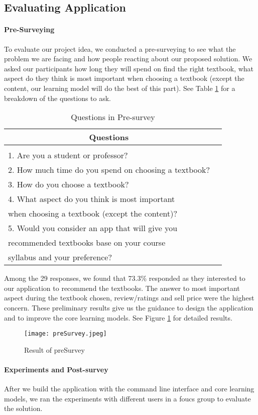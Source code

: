 \subsection{Evaluating Application}
\paragraph{Pre-Surveying}
To evaluate our project idea, we conducted a pre-surveying to see what the problem we are facing and how people reacting about our proposed solution. We asked our participants how long they will spend on find the right textbook, what aspect do they think is most important when choosing a textbook (except the content, our learning model will do the best of this part). See Table \ref{Pre-survey} for a breakdown of the questions to ask.

\begin{table}[ht] 
\caption{Questions in Pre-survey}
\label{Pre-survey}
\begin{center}
\begin{tabular}{ll}
\multicolumn{1}{c}{\bf Questions} 
\\ \hline \\
1. Are you a student or professor?\\
2. How much time do you spend on choosing a textbook?\\
3. How do you choose a textbook?\\
4. What aspect do you think is most important\\
when choosing a textbook (except the content)? \\
5. Would you consider an app that will give you \\
recommended textbooks base on your course \\
syllabus and your preference? \\
\end{tabular}
\end{center}
\end{table}
Among the 29 responses, we found that 73.3\% responded as they interested to our application to recommend the textbooks. The answer to most important aspect during the textbook chosen, review/ratings and sell price were the highest concern. These preliminary results give us the guidance to design the application and to improve the core learning models. See Figure \ref{result_of_presurvey} for detailed results.

\begin{figure}[ht]
\caption{Result of preSurvey}
\label{result_of_presurvey}
\centering
\texttt{[image: preSurvey.jpeg]}
\end{figure}

\paragraph{Experiments and Post-survey}
After we build the application with the command line interface and core learning models, we ran the experiments with different users in a foucs group to evaluate the solution.

